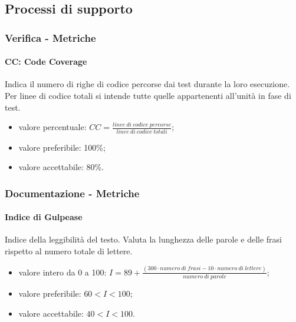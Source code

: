 	\subsection{Processi di supporto}
		\subsubsection{Verifica - Metriche}
		\paragraph{CC: Code Coverage}
		Indica il numero di righe di codice percorse dai test durante la loro esecuzione. Per linee di codice totali si intende tutte quelle appartenenti all'unità in fase di test.
		\begin{itemize}
		\item valore percentuale: $CC = \frac{linee \ di \ codice \ percorse}{linee \ di \ codice \ totali}$;
		\item valore preferibile: 100\%;
		\item valore accettabile: 80\%.
		\end{itemize}
		
		\subsubsection{Documentazione - Metriche}
		\paragraph{Indice di Gulpease}
		Indice della leggibilità del testo. Valuta la lunghezza delle parole e delle frasi rispetto al numero totale di lettere.
		\begin{itemize}
		\item valore intero da 0 a 100: $I = 89 + \frac{(300 \cdot numero \ di \ frasi - 10 \cdot numero \ di \ lettere)}{numero \ di \ parole}$;
		\item valore preferibile: $60 < I < 100$;
		\item valore accettabile: $40 < I < 100$.
		\end{itemize}
		
		\newpage
